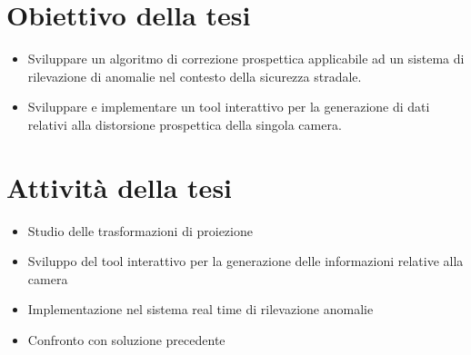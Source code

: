 





\section{Obiettivo della tesi}
\begin{itemize}
	\item Sviluppare un algoritmo di correzione prospettica applicabile ad un sistema di rilevazione di anomalie nel contesto della sicurezza stradale.
	\item Sviluppare e implementare un tool interattivo per la generazione di dati relativi alla distorsione prospettica della singola camera.
\end{itemize}

\section{Attività della tesi}

\begin{itemize}
	\item Studio delle trasformazioni di proiezione
	\item Sviluppo del tool interattivo per la generazione delle informazioni relative alla camera
	\item Implementazione nel sistema real time di rilevazione anomalie
	\item Confronto con soluzione precedente
\end{itemize}


